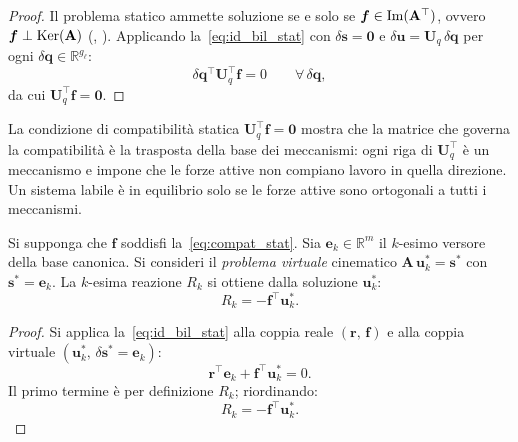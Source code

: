 \begin{proof}
	Il problema statico ammette soluzione se e solo se
	$\bm{f} \in \operatorname{Im}(\mathbf{A}^{\top})$, ovvero $\bm{f} \perp
	\operatorname{Ker}(\mathbf{A})$ (,
	). Applicando
	la~\eqref{eq:id_bil_stat} con $\delta\bm{s} = \bm{0}$
	e $\delta\bm{u} = \bm{U}_q\,\delta\bm{q}$ per ogni
	$\delta\bm{q} \in \mathbb{R}^{g_\ell}$:
	\begin{equation*}
		\delta\bm{q}^{\top}\bm{U}_q^{\top}\bm{f} = 0
		\qquad \forall\,\delta\bm{q},
	\end{equation*}
	da cui $\bm{U}_q^{\top}\bm{f} = \bm{0}$.
\end{proof}

\begin{oss}
	La condizione di compatibilità statica
	$\bm{U}_q^{\top}\bm{f} = \bm{0}$ mostra che la
	matrice che governa la compatibilità è la trasposta
	della base dei meccanismi: ogni riga di
	$\bm{U}_q^{\top}$ è un meccanismo e impone che le
	forze attive non compiano lavoro in quella direzione.
	Un sistema labile è in equilibrio solo se le forze
	attive sono ortogonali a tutti i meccanismi.
\end{oss}

\begin{corollario}
	\label{cor:TSV}
	\label{cor:cedimento}
	Si supponga che $\bm{f}$ soddisfi
	la~\eqref{eq:compat_stat}. Sia $\bm{e}_k \in
	\mathbb{R}^m$ il $k$-esimo versore della base canonica.
	Si consideri il \emph{problema virtuale} cinematico
	$\bm{A}\,\bm{u}^*_k = \bm{s}^*$ con
	$\bm{s}^* = \bm{e}_k$. La $k$-esima reazione
	$R_k$ si ottiene dalla soluzione $\bm{u}^*_k$:
	\begin{equation}\label{eq:mueller_breslau}
		R_k = -\bm{f}^{\top}\bm{u}^*_k.
	\end{equation}
\end{corollario}

\begin{proof}
	Si applica la~\eqref{eq:id_bil_stat} alla coppia reale
	$(\bm{r},\,\bm{f})$ e alla coppia virtuale
	$(\bm{u}^*_k,\,\delta\bm{s}^* = \bm{e}_k)$:
	\begin{equation}
		\bm{r}^{\top}\bm{e}_k +
		\bm{f}^{\top}\bm{u}^*_k = 0.
	\end{equation}
	Il primo termine è per definizione $R_k$; riordinando:
	\begin{equation}
		R_k = -\bm{f}^{\top}\bm{u}^*_k. 
	\end{equation}
\end{proof}

